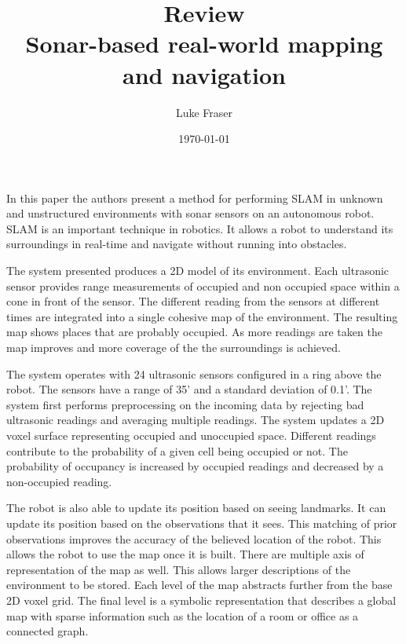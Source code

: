 \documentclass{article}
\begin{document}
\title{{\large Review} \\ Sonar-based real-world mapping and navigation}
\author{Luke Fraser}
\date{\today}
\maketitle

\begingroup
\renewcommand{\section}[2]{}


\endgroup

\section*{Summary}
In this paper the authors present a method for performing SLAM in unknown and unstructured environments with sonar sensors on an autonomous robot. SLAM is an important technique in robotics. It allows a robot to understand its surroundings in real-time and navigate without running into obstacles.

The system presented produces a 2D model of its environment. Each ultrasonic sensor provides range measurements of occupied and non occupied space within a cone in front of the sensor. The different reading from the sensors at different times are integrated into a single cohesive map of the environment. The resulting map shows places that are probably occupied. As more readings are taken the map improves and more coverage of the the surroundings is achieved.

The system operates with 24 ultrasonic sensors configured in a ring above the robot. The sensors have a range of 35' and a standard deviation of 0.1'. The system first performs preprocessing on the incoming data by rejecting bad ultrasonic readings and averaging multiple readings. The system updates a 2D voxel surface representing occupied and unoccupied space. Different readings contribute to the probability of a given cell being occupied or not. The probability of occupancy is increased by occupied readings and decreased by a non-occupied reading.

The robot is also able to update its position based on seeing landmarks. It can update its position based on the observations that it sees. This matching of prior observations improves the accuracy of the believed location of the robot. This allows the robot to use the map once it is built. There are multiple axis of representation of the map as well. This allows larger descriptions of the environment to be stored. Each level of the map abstracts further from the base 2D voxel grid. The final level is a symbolic representation that describes a global map with sparse information such as the location of a room or office as a connected graph.
\end{document}
